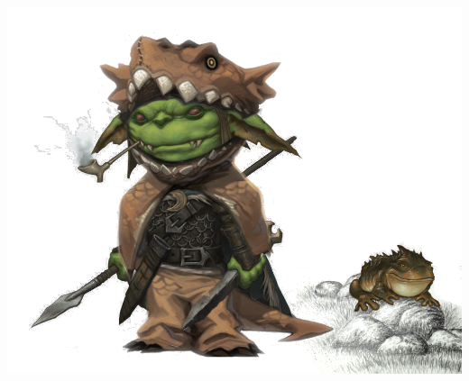 \begin{multicols}{2}
\begin{center}
\includegraphics[width=\textwidth]{./content/img/krokokolo.png}
\begin{figure}[h]
\end{figure}
\end{center}

\end{multicols}

\vspace*{5mm}



\clearpage
